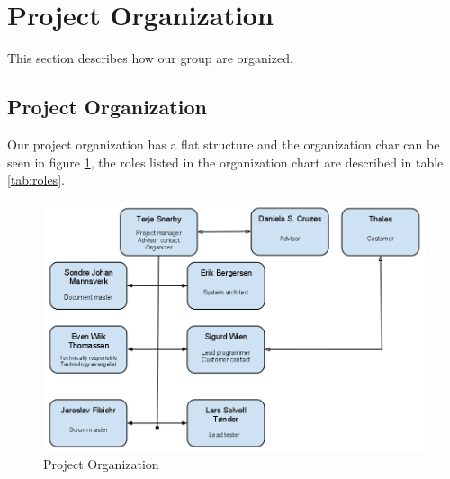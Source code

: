 \section{Project Organization}
This section describes how our group are organized.
\subsection{Project Organization}
Our project organization has a flat structure and the organization char can be seen in figure \ref{fig:orgchart}, the roles listed in the organization chart are described in table \ref{tab:roles}. \newline
\\
\begin{figure}[here]
\includegraphics[scale=0.45]{./planning/img/organization.png}
\caption{Project Organization}
\label{fig:orgchart}
\end{figure}

